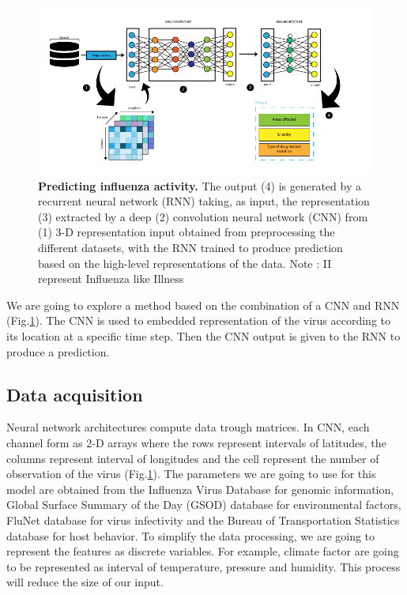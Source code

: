 \documentclass[12pt]{article}
\begin{document}
\begin{figure}[h]
    \centering
    \includegraphics[width=\textwidth]{figure-1.png}
    \caption{\textbf{Predicting influenza activity.}  The output (4) is generated by a recurrent neural network (RNN) taking, as input, the representation  (3)  extracted by a deep (2) convolution neural network (CNN) from  (1) 3-D representation input obtained from preprocessing the different datasets, with the RNN trained to produce prediction based on the high-level representations of the data. Note : II represent Influenza like Illness }
    \label{fig:model}
\end{figure}

We are going to explore a method based on the combination of a CNN and RNN (Fig.\ref{fig:model}). The CNN is used to embedded representation of the virus according to its location at a specific time step. Then the CNN output is given to the RNN to produce a prediction. 


\subsection{Data acquisition}
Neural network architectures compute data trough matrices. In CNN,  each channel form as 2-D arrays where the rows represent intervals of latitudes, the columns represent interval of longitudes and the cell represent the number of observation of the virus (Fig.\ref{fig:model}). The parameters we are going to use for this model are obtained from the Influenza Virus Database\autocite{chang2006influenza} for genomic information, Global Surface Summary of the Day (GSOD)\autocite{Lott1998} database for environmental factors, FluNet database\autocite{flahault1998} for virus infectivity and the Bureau of Transportation Statistics database\autocite{mcdonald2013} for host behavior. To simplify the data processing, we are going to represent the features as discrete variables. For example, climate factor are going to be represented as interval of temperature, pressure and humidity. This process will reduce the size of our input.
 
\end{document}

